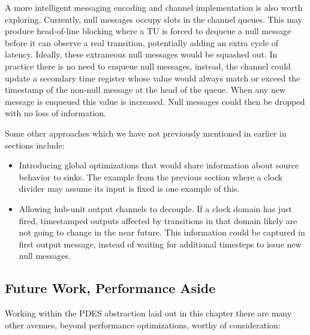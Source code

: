 A more intelligent messaging encoding and channel implementation is also worth
exploring.  Currently, null messages occupy slots in the channel queues. This
may produce head-of-line blocking where a TU is forced to dequeue a null
message before it can observe a real transition, potentially adding an extra
cycle of latency. Ideally, these extraneous null messages would be squashed
out.  In practice there is no need to enqueue null messages, instead, the
channel could update a secondary time register whose value would always match
or exceed the timestamp of the non-null message at the head of the queue. When
any new message is enqueued this value is increased. Null messages could then
be dropped with no loss of information.

Some other approaches which we have not previously mentioned in earlier in sections include:
\begin{itemize}
    \item Introducing global optimizations that would share information about
        source behavior to sinks.  The example from the previous section where
        a clock divider may assume its input is fixed is one example of this.
\item Allowing hub-unit output channels to decouple. If a clock domain has just
    fired, timestamped outputs affected by transitions in that domain likely
    are not going to change in the near future. This information could be
    captured in first output message, instead of waiting for additional
    timesteps to issue new null messages.
\end{itemize}

\subsection{Future Work, Performance Aside}

Working within the PDES abstraction laid out in this chapter there are many other avenues, beyond performance optimizations,
worthy of consideration:

